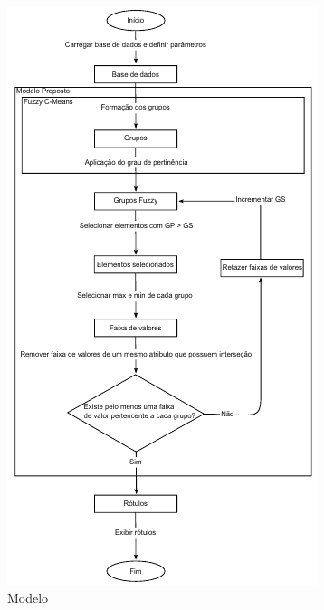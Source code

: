 \begin{figure}[h]
        \centering
        \includegraphics{figs/modeloRotFuzzy.png}
        \caption{Modelo \cite{Filho2015}} \label{fig:modeloFilhoVilmar}
\end{figure}




